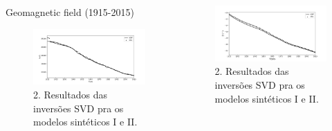 \documentclass[final,t]{beamer}
\begin{document}
\begin{columns}[t]
\begin{column}{.33\linewidth}
\begin{block}{Geomagnetic field (1915-2015)}
\begin{figure}
	\centering
	\includegraphics[width=1.0\linewidth]{F}
	\caption{2. Resultados das inversões SVD pra os modelos sintéticos I e II.}
	\label{fig:g_Sintetico}
\end{figure}

\end{block}	


\end{column}
\begin{column}{.31\linewidth}

\begin{block}{}
	\justifying
	

	\begin{figure}
		\centering
		\includegraphics[width=1.0\linewidth]{D}
		\caption{2. Resultados das inversões SVD pra os modelos sintéticos I e II.}
		\label{fig:g_Sintetico}
	\end{figure}
	

\end{block}
\end{column}
\end{columns}
\end{document}

